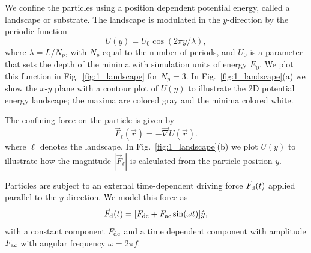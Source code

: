 \documentclass[preprint,showpacs,preprintnumbers,amsmath,amssymb,aps,prb]{revtex4-1}
\theoremstyle{remark}
\begin{document}
We confine the particles using a position dependent 
potential energy, called a landscape or substrate.
The landscape is modulated in the $y$-direction
by the periodic function 
 \begin{equation}
   U(y) = U_0 \cos{(2 \pi y / \lambda)},
     \label{eq:ysubstrate}
\end{equation}
where $\lambda=L/N_p$, with $N_p$ equal to the number of periods,
and $U_0$ is a parameter
 that sets the depth of the minima
 with simulation units of energy $E_0$. 
 We plot this function in 
 Fig.~\ref{fig:1_landscape}
 for $N_p = 3$.  In Fig.~\ref{fig:1_landscape}(a) we show 
 the $x$-$y$ plane with a contour plot of $U(y)$ 
 to illustrate
 the 2D potential energy landscape;
 the maxima are colored gray and the minima colored white.

The confining force on the particle %
 is given by
 \begin{equation}
 \vec{F}_{\ell}(\vec{r}) = - \vec \nabla U(\vec{r}). %
 \label{eq:dudr}
 \end{equation}
 where $\ell$ denotes the landscape.
 In Fig.~\ref{fig:1_landscape}(b) we plot  
 $U(y)$ to illustrate how the magnitude
 $|\vec{F}_{\ell}|$ is calculated from the particle position $y$.
 
Particles are subject to an external time-dependent driving force
$\vec{F}_{\rm d}(t)$
applied parallel to the $y$-direction.
We model this force as
\begin{equation}
  \vec{F}_{\rm d}(t) = [F_{\rm dc} + F_{\rm ac} \sin(\omega t)] \hat{y},
    \label{eq:drive}
\end{equation}
with 
a constant component $F_{\rm dc}$
and a time dependent component with amplitude $F_{\rm ac}$
with angular frequency $\omega = 2 \pi f$.
\end{document}

